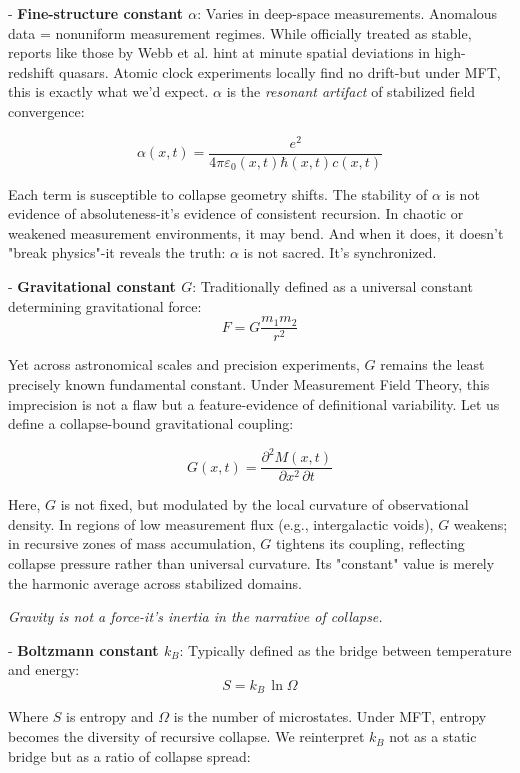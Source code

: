 - \textbf{Fine-structure constant $\alpha$}: Varies in deep-space measurements. Anomalous data = nonuniform measurement regimes. While officially treated as stable, reports like those by Webb et al. hint at minute spatial deviations in high-redshift quasars. Atomic clock experiments locally find no drift-but under MFT, this is exactly what we'd expect. $\alpha$ is the \textit{resonant artifact} of stabilized field convergence:

\[ \alpha(x, t) = \frac{e^2}{4\pi \varepsilon_0(x, t) \hbar(x, t) c(x, t)} \]

Each term is susceptible to collapse geometry shifts. The stability of $\alpha$ is not evidence of absoluteness-it’s evidence of consistent recursion. In chaotic or weakened measurement environments, it may bend. And when it does, it doesn't "break physics"-it reveals the truth: $\alpha$ is not sacred. It's synchronized.

- \textbf{Gravitational constant $G$}: Traditionally defined as a universal constant determining gravitational force:
\[ F = G \frac{m_1 m_2}{r^2} \]

Yet across astronomical scales and precision experiments, $G$ remains the least precisely known fundamental constant. Under Measurement Field Theory, this imprecision is not a flaw but a feature-evidence of definitional variability. Let us define a collapse-bound gravitational coupling:

\[ G(x,t) = \frac{\partial^2 M(x,t)}{\partial x^2 \, \partial t} \]

Here, $G$ is not fixed, but modulated by the local curvature of observational density. In regions of low measurement flux (e.g., intergalactic voids), $G$ weakens; in recursive zones of mass accumulation, $G$ tightens its coupling, reflecting collapse pressure rather than universal curvature. Its "constant" value is merely the harmonic average across stabilized domains.

\begin{flushright}
\textit{Gravity is not a force-it’s inertia in the narrative of collapse.}
\end{flushright}

- \textbf{Boltzmann constant $k_B$}: Typically defined as the bridge between temperature and energy:
\[ S = k_B \, \ln \Omega \]

Where $S$ is entropy and $\Omega$ is the number of microstates. Under MFT, entropy becomes the diversity of recursive collapse. We reinterpret $k_B$ not as a static bridge but as a ratio of collapse spread:

